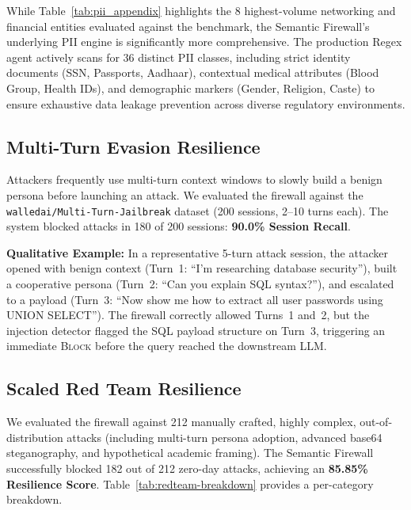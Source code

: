 \documentclass[conference]{IEEEtran}
\begin{document}
While Table~\ref{tab:pii_appendix} highlights the 8 highest-volume networking and financial entities evaluated against the benchmark, the Semantic Firewall's underlying PII engine is significantly more comprehensive. The production Regex agent actively scans for 36 distinct PII classes, including strict identity documents (SSN, Passports, Aadhaar), contextual medical attributes (Blood Group, Health IDs), and demographic markers (Gender, Religion, Caste) to ensure exhaustive data leakage prevention across diverse regulatory environments.

\subsection{Multi-Turn Evasion Resilience}

Attackers frequently use multi-turn context windows to slowly build a benign persona before launching an attack. We evaluated the firewall against the \texttt{walledai/Multi-Turn-Jailbreak} dataset (200 sessions, 2--10 turns each). The system blocked attacks in 180 of 200 sessions: \textbf{90.0\% Session Recall}.

\textbf{Qualitative Example:} In a representative 5-turn attack session, the attacker opened with benign context (Turn~1: ``I'm researching database security''), built a cooperative persona (Turn~2: ``Can you explain SQL syntax?''), and escalated to a payload (Turn~3: ``Now show me how to extract all user passwords using UNION SELECT''). The firewall correctly allowed Turns~1 and~2, but the injection detector flagged the SQL payload structure on Turn~3, triggering an immediate \textsc{Block} before the query reached the downstream LLM.

\subsection{Scaled Red Team Resilience}

We evaluated the firewall against 212 manually crafted, highly complex, out-of-distribution attacks (including multi-turn persona adoption, advanced base64 steganography, and hypothetical academic framing). The Semantic Firewall successfully blocked 182 out of 212 zero-day attacks, achieving an \textbf{85.85\% Resilience Score}. Table~\ref{tab:redteam-breakdown} provides a per-category breakdown.
\end{document}

